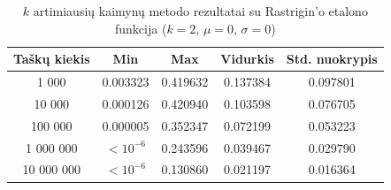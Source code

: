 \begin{table}[H]
    \centering
    \begin{tabular}{|c|c|c|c|c|}
        \hline
        \textbf{Taškų kiekis} & \textbf{Min} & \textbf{Max} & \textbf{Vidurkis} & \textbf{Std. nuokrypis} \\ \hline
        1 000        & 0.003323 & 0.419632 & 0.137384 & 0.097801 \\ \hline
        10 000       & 0.000126 & 0.420940 & 0.103598 & 0.076705 \\ \hline
        100 000      & 0.000005 & 0.352347 & 0.072199 & 0.053223 \\ \hline
        1 000 000    & $<10^{-6}$ & 0.243596 & 0.039467 & 0.029790 \\ \hline
        10 000 000   & $<10^{-6}$ & 0.130860 & 0.021197 & 0.016364 \\ \hline
    \end{tabular}
    \caption{$k$ artimiausių kaimynų metodo rezultatai su Rastrigin'o etalono funkcija ($k = 2$, $\mu = 0$, $\sigma = 0$)}
\end{table}